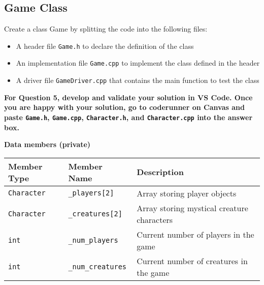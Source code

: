 \newpage
\subsection{Game Class} 

Create a class Game by splitting the code into the following files:

\begin{itemize}
    \item A header file \texttt{Game.h} to declare the definition of the class
    \item  An implementation file \texttt{Game.cpp} to implement the class defined in the header
    \item  A driver file \texttt{GameDriver.cpp} that contains the main function to test the class
\end{itemize}

\textbf{For Question 5, develop and validate your solution in VS Code. Once you are happy with your solution, go to coderunner on Canvas and paste \texttt{Game.h}, \texttt{Game.cpp}, \texttt{Character.h}, and \texttt{Character.cpp} into the answer box.} 

\vspace{10pt}

\textbf{Data members (private)}

\renewcommand{\arraystretch}{1.5}
\begin{longtable}{|p{1.5in}|p{1.5in}|p{2.9in}|}
\hline
\textbf{Member Type} & \textbf{Member Name} & \textbf{Description} \\ \hline

\texttt{Character} & \texttt{_players[2]} & Array storing player objects \\ \hline

\texttt{Character} & \texttt{_creatures[2]} & Array storing mystical creature characters \\ \hline

\texttt{int} & \texttt{_num_players} & Current number of players in the game \\ \hline

\texttt{int} & \texttt{_num_creatures} & Current number of creatures in the game \\ \hline

\end{longtable}



